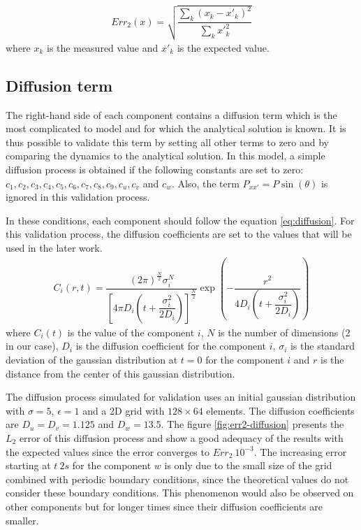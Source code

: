\documentclass[a4paper]{article}
\begin{document}
\begin{align}
\label{eq:l2-error}
	Err_2(x)= \sqrt{\dfrac{\sum_k \left( x_k - x'_k \right)^2}{\sum_k x'^2_k}}
\end{align}
where $x_k$ is the measured value and $x'_k$ is the expected value.

\subsection{Diffusion term}
\label{ssec:diffusion}

The right-hand side of each component contains a diffusion term which is the most complicated to model and for which the analytical solution is known. It is thus possible to validate this term by setting all other terms to zero and by comparing the dynamics to the analytical solution. In this model, a simple diffusion process is obtained if the following constants are set to zero: $c_1, c_2, c_3, c_4, c_5, c_6, c_7, c_8, c_9, c_u, c_v$ and $c_w$.
Also, the term $P_{xx'} = P \sin (\theta)$ is ignored in this validation process.

In these conditions, each component should follow the equation \ref{eq:diffusion}. For this validation process, the diffusion coefficients are set to the values that will be used in the later work.
\begin{align}
\label{eq:diffusion}
	C_i(r, t)= \dfrac{ \left( 2 \pi \right) ^\frac{N}{2} \sigma^N_i }{ \left[ 4 \pi D_i \left( t + \dfrac{\sigma^2_i}{2D_i} \right) \right]^\frac{N}{2} } \exp \left(- \dfrac{r^2}{4 D_i \left ( t + \dfrac{\sigma^2_i}{2D_i} \right) } \right)
\end{align}
where $C_i(t)$ is the value of the component $i$, $N$ is the number of dimensions (2 in our case), $D_i$ is the diffusion coefficient for the component $i$, $\sigma_i$ is the standard deviation of the gaussian distribution at $t=0$ for the component $i$ and $r$ is the distance from the center of this gaussian distribution.

The diffusion process simulated for validation uses an initial gaussian distribution with $\sigma = 5$, $\epsilon = 1$ and a 2D grid with $128 \times 64$ elements. The diffusion coefficients are $D_u = D_v = 1.125$ and $D_w = 13.5$. The figure \ref{fig:err2-diffusion} presents the $L_2$ error of this diffusion process and show a good adequacy of the results with the expected values since the error converges to $Err_2 ~ 10^{-3}$. The increasing error starting at $t~2s$ for the component $w$ is only due to the small size of the grid combined with periodic boundary conditions, since the theoretical values do not consider these boundary conditions. This phenomenon would also be observed on other components but for longer times since their diffusion coefficients are smaller.
\end{document}
